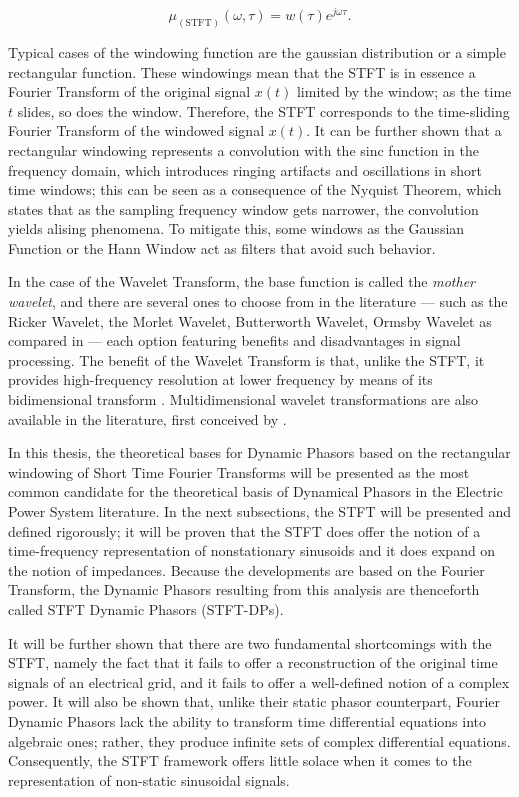 \begin{equation} \mu_{\left(\text{STFT}\right)}\left(\omega,\tau\right) = w\left(\tau\right)e^{j\omega\tau}.\end{equation}
	
	Typical cases of the windowing function are the gaussian distribution or a simple rectangular function. These windowings mean that the STFT is in essence a Fourier Transform of the original signal $x(t)$ limited by the window; as the time $t$ slides, so does the window. Therefore, the STFT corresponds to the time-sliding Fourier Transform of the windowed signal $x(t)$. It can be further shown that a rectangular  windowing represents a convolution with the sinc function in the frequency domain, which introduces ringing artifacts and oscillations in short time windows; this can be seen as a consequence of the Nyquist Theorem, which states that as the sampling frequency window gets narrower, the convolution yields alising phenomena. To mitigate this, some windows as the Gaussian Function or the Hann Window act as filters that avoid such behavior.

	In the case of the Wavelet Transform, the base function is called the \textit{mother wavelet}, and there are several ones to choose from in the literature — such as the Ricker Wavelet, the Morlet Wavelet, Butterworth Wavelet, Ormsby Wavelet as compared in \cite{ryanRickerOrmsbyKlander1994} — each option featuring benefits and disadvantages in signal processing. The benefit of the Wavelet Transform is that, unlike the STFT, it provides high-frequency resolution at lower frequency by means of its bidimensional transform . Multidimensional wavelet transformations are also available in the literature, first conceived by \cite{zouDiscreteOrthogonalMband1992}.

	In this thesis, the theoretical bases for Dynamic Phasors based on the rectangular windowing of Short Time Fourier Transforms will be presented as the most common candidate for the theoretical basis of Dynamical Phasors in the Electric Power System literature. In the next subsections, the STFT will be presented and defined rigorously; it will be proven that the STFT does offer the notion of a time-frequency representation of nonstationary sinusoids and it does expand on the notion of impedances. Because the developments are based on the Fourier Transform, the Dynamic Phasors resulting from this analysis are thenceforth called STFT Dynamic Phasors (STFT-DPs).

	It will be further shown that there are two fundamental shortcomings with the STFT, namely the fact that it fails to offer a reconstruction of the original time signals of an electrical grid, and it fails to offer a well-defined notion of a complex power. It will also be shown that, unlike their static phasor counterpart, Fourier Dynamic Phasors lack the ability to transform time differential equations into algebraic ones; rather, they produce infinite sets of complex differential equations. Consequently, the STFT framework offers little solace when it comes to the representation of non-static sinusoidal signals.

